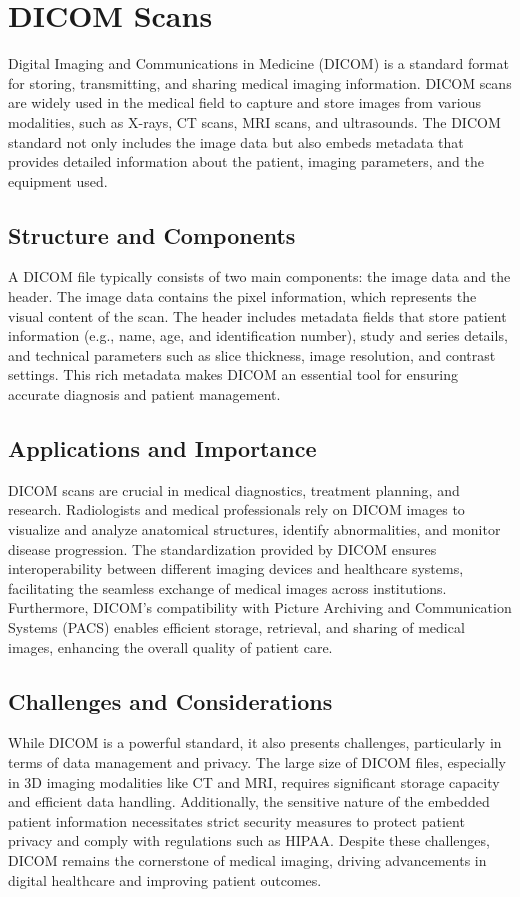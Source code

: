 \section{DICOM Scans}

Digital Imaging and Communications in Medicine (DICOM) is a standard format for storing, transmitting, and sharing medical imaging information. DICOM scans are widely used in the medical field to capture and store images from various modalities, such as X-rays, CT scans, MRI scans, and ultrasounds. The DICOM standard not only includes the image data but also embeds metadata that provides detailed information about the patient, imaging parameters, and the equipment used.

\subsection{Structure and Components}

A DICOM file typically consists of two main components: the image data and the header. The image data contains the pixel information, which represents the visual content of the scan. The header includes metadata fields that store patient information (e.g., name, age, and identification number), study and series details, and technical parameters such as slice thickness, image resolution, and contrast settings. This rich metadata makes DICOM an essential tool for ensuring accurate diagnosis and patient management.

\subsection{Applications and Importance}

DICOM scans are crucial in medical diagnostics, treatment planning, and research. Radiologists and medical professionals rely on DICOM images to visualize and analyze anatomical structures, identify abnormalities, and monitor disease progression. The standardization provided by DICOM ensures interoperability between different imaging devices and healthcare systems, facilitating the seamless exchange of medical images across institutions. Furthermore, DICOM's compatibility with Picture Archiving and Communication Systems (PACS) enables efficient storage, retrieval, and sharing of medical images, enhancing the overall quality of patient care.

\subsection{Challenges and Considerations}

While DICOM is a powerful standard, it also presents challenges, particularly in terms of data management and privacy. The large size of DICOM files, especially in 3D imaging modalities like CT and MRI, requires significant storage capacity and efficient data handling. Additionally, the sensitive nature of the embedded patient information necessitates strict security measures to protect patient privacy and comply with regulations such as HIPAA. Despite these challenges, DICOM remains the cornerstone of medical imaging, driving advancements in digital healthcare and improving patient outcomes.
